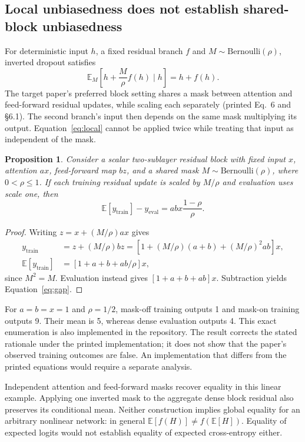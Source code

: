 \documentclass[10pt,letterpaper]{article}
\newtheorem{proposition}{Proposition}
\newcommand{\E}{\mathbb{E}}
\begin{document}
\subsection{Local unbiasedness does not establish shared-block unbiasedness}
For deterministic input $h$, a fixed residual branch $f$ and $M\sim\mathrm{Bernoulli}(\rho)$, inverted dropout satisfies
\begin{equation}
\E_M\!\left[h+\frac{M}{\rho}f(h)\mid h\right]=h+f(h).
\label{eq:local}
\end{equation}
The target paper's preferred block setting shares a mask between attention and feed-forward residual updates, while scaling each separately (printed Eq.~6 and \S6.1). The second branch's input then depends on the same mask multiplying its output. Equation~\ref{eq:local} cannot be applied twice while treating that input as independent of the mask.

\begin{proposition}
Consider a scalar two-sublayer residual block with fixed input $x$, attention $ax$, feed-forward map $bz$, and a shared mask $M\sim\mathrm{Bernoulli}(\rho)$, where $0<\rho\leq1$. If each training residual update is scaled by $M/\rho$ and evaluation uses scale one, then
\begin{equation}
\E[y_{\mathrm{train}}]-y_{\mathrm{eval}}=abx\frac{1-\rho}{\rho}.
\label{eq:gap}
\end{equation}
\end{proposition}
\begin{proof}
Writing $z=x+(M/\rho)ax$ gives
\begin{align}
y_{\mathrm{train}}&=z+(M/\rho)bz
=\left[1+(M/\rho)(a+b)+(M/\rho)^2ab\right]x,\\
\E[y_{\mathrm{train}}]&=\left[1+a+b+ab/\rho\right]x,
\end{align}
since $M^2=M$. Evaluation instead gives $[1+a+b+ab]x$. Subtraction yields Equation~\ref{eq:gap}.
\end{proof}
For $a=b=x=1$ and $\rho=1/2$, mask-off training outputs 1 and mask-on training outputs 9. Their mean is 5, whereas dense evaluation outputs 4. This exact enumeration is also implemented in the repository. The result corrects the stated rationale under the printed implementation; it does not show that the paper's observed training outcomes are false. An implementation that differs from the printed equations would require a separate analysis.

Independent attention and feed-forward masks recover equality in this linear example. Applying one inverted mask to the aggregate dense block residual also preserves its conditional mean. Neither construction implies global equality for an arbitrary nonlinear network: in general $\E[f(H)]\ne f(\E[H])$. Equality of expected logits would not establish equality of expected cross-entropy either.
\end{document}
